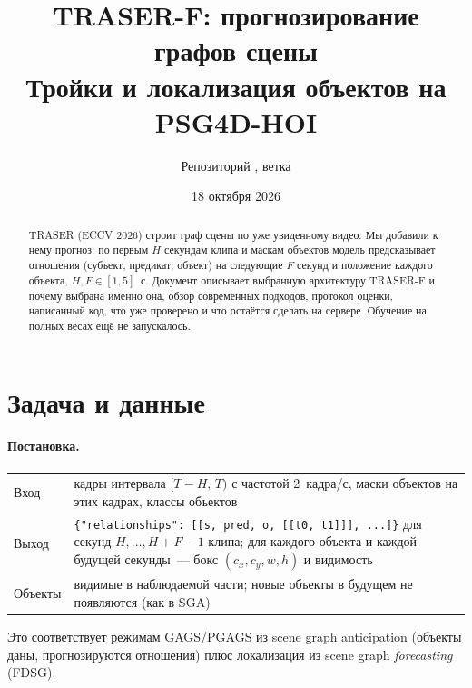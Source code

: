 \documentclass[11pt,a4paper]{article}
\title{\textbf{TRASER-F: прогнозирование графов сцены}\\[2pt]
  \large Тройки и локализация объектов на PSG4D-HOI}
\author{Репозиторий \href{https://github.com/lve-gh/SVG2/tree/forecasting}{\code{lve-gh/SVG2}}, ветка \code{forecasting}}
\date{18 октября 2026}
\newcommand{\code}[1]{\texttt{#1}}
\begin{document}
\maketitle

\begin{abstract}
TRASER (ECCV 2026) строит граф сцены по уже увиденному видео. Мы добавили к нему прогноз:
по первым $H$ секундам клипа и маскам объектов модель предсказывает отношения
(субъект, предикат, объект) на следующие $F$ секунд и положение каждого объекта, $H,F\in[1,5]$~с.
Документ описывает выбранную архитектуру TRASER-F и почему выбрана именно она, обзор
современных подходов, протокол оценки, написанный код, что уже проверено и что остаётся
сделать на сервере. Обучение на полных весах ещё не запускалось.
\end{abstract}

\tableofcontents

\section{Задача и данные}

\paragraph{Постановка.}
\begin{center}
\begin{tabularx}{\linewidth}{@{}lL@{}}
\toprule
Вход & кадры интервала $[T-H,\,T)$ с частотой 2~кадра/с, маски объектов на этих кадрах, классы объектов \\
Выход & \code{\{"relationships": [[s, pred, o, [[t0, t1]]], ...]\}} для секунд $H,\dots,H+F-1$ клипа;
        для каждого объекта и каждой будущей секунды~--- бокс $(c_x,c_y,w,h)$ и видимость \\
Объекты & видимые в наблюдаемой части; новые объекты в будущем не появляются (как в SGA) \\
\bottomrule
\end{tabularx}
\end{center}
Это соответствует режимам GAGS/PGAGS из scene graph anticipation (объекты даны, прогнозируются
отношения) плюс локализация из scene graph \emph{forecasting} (FDSG).
\end{document}
